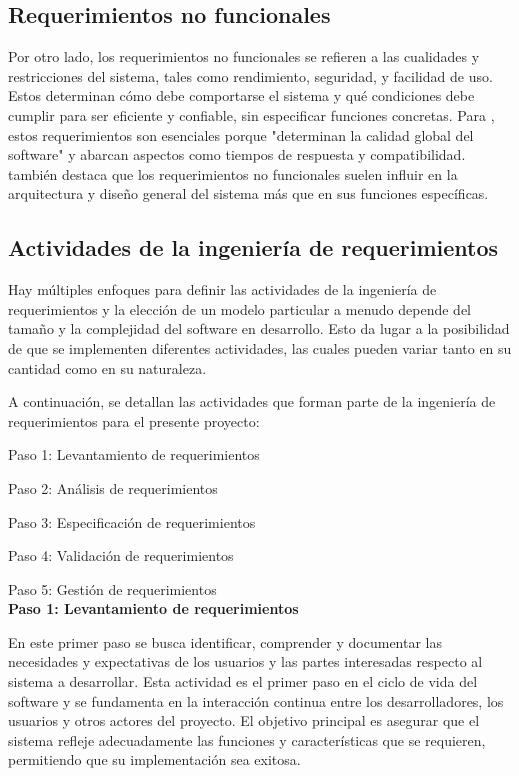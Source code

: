 	\subsection{Requerimientos no funcionales}
		Por otro lado, los requerimientos no funcionales se refieren a las cualidades y restricciones del sistema, tales como rendimiento, seguridad, y facilidad de uso. Estos determinan cómo debe comportarse el sistema y qué condiciones debe cumplir para ser eficiente y confiable, sin especificar funciones concretas. Para \textcite{pressman2010ingenieria}, estos requerimientos son esenciales porque "determinan la calidad global del software" y abarcan aspectos como tiempos de respuesta y compatibilidad. \textcite{sommerville2011introduccion} también destaca que los requerimientos no funcionales suelen influir en la arquitectura y diseño general del sistema más que en sus funciones específicas.
	\subsection{Actividades de la ingeniería de requerimientos}
		Hay múltiples enfoques para definir las actividades de la ingeniería de requerimientos y la elección de un modelo particular a menudo depende del tamaño y la complejidad del software en desarrollo. Esto da lugar a la posibilidad de que se implementen diferentes actividades, las cuales pueden variar tanto en su cantidad como en su naturaleza.
		
		A continuación, se detallan las actividades que forman parte de la ingeniería de requerimientos para el presente proyecto:
		
		Paso 1: Levantamiento de requerimientos
		
		Paso 2: Análisis de requerimientos
		
		Paso 3: Especificación de requerimientos
		
		Paso 4: Validación de requerimientos
		
		Paso 5: Gestión de requerimientos\\
		\textbf{Paso 1: Levantamiento de requerimientos}
		
		En este primer paso se busca identificar, comprender y documentar las necesidades y expectativas de los usuarios y las partes interesadas respecto al sistema a desarrollar. Esta actividad es el primer paso en el ciclo de vida del software y se fundamenta en la interacción continua entre los desarrolladores, los usuarios y otros actores del proyecto. El objetivo principal es asegurar que el sistema refleje adecuadamente las funciones y características que se requieren, permitiendo que su implementación sea exitosa.
		
